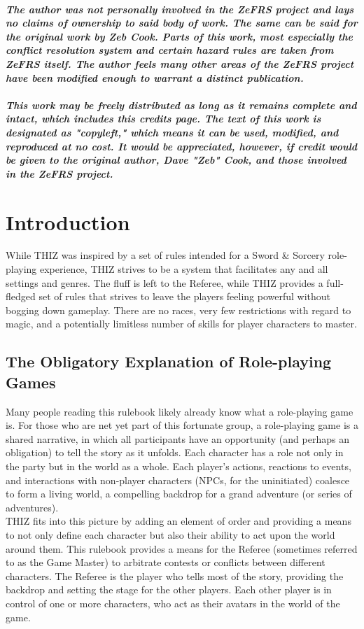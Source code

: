 \documentclass[oneside]{book}
\begin{document}
\paragraph{The author was not personally involved in the ZeFRS project and lays no claims of ownership to said body of work. The same can be said for the original work by Zeb Cook. Parts of this work, most especially the conflict resolution system and certain hazard rules are taken from ZeFRS itself. The author feels many other areas of the ZeFRS project have been modified enough to warrant a distinct publication. \\ \\
This work may be freely distributed as long as it remains complete and intact, which includes this credits page. The text of this work is designated as "copyleft," which means it can be used, modified, and reproduced at no cost. It would be appreciated, however, if credit would be given to the original author, Dave "Zeb" Cook, and those involved in the ZeFRS project.}

\tableofcontents

\chapter{Introduction}

While THIZ was inspired by a set of rules intended for a Sword \& Sorcery role-playing experience, THIZ strives to be a system that facilitates any and all settings and genres. The fluff is left to the Referee, while THIZ provides a full-fledged set of rules that strives to leave the players feeling powerful without bogging down gameplay. There are no races, very few restrictions with regard to magic, and a potentially limitless number of skills for player characters to master. 

\section*{The Obligatory Explanation of Role-playing Games}

Many people reading this rulebook likely already know what a role-playing game is. For those who are net yet part of this fortunate group, a role-playing game is a shared narrative, in which all participants have an opportunity (and perhaps an obligation) to tell the story as it unfolds. Each character has a role not only in the party but in 
the world as a whole. Each player's actions, reactions to events, and interactions with non-player characters (NPCs, for the uninitiated) coalesce to form a living world, a compelling backdrop for a grand adventure (or series of adventures). \\
THIZ fits into this picture by adding an element of order and providing a means to not only define each character but also their ability to act upon the world around them. This rulebook provides a means for the Referee (sometimes referred to as the Game Master) to arbitrate contests or conflicts between different characters. The Referee is the player who tells most of the story, providing the backdrop and setting the stage for the other players. Each other player is in control of one or more characters, who act as their avatars in the world of the game. 
\end{document}
